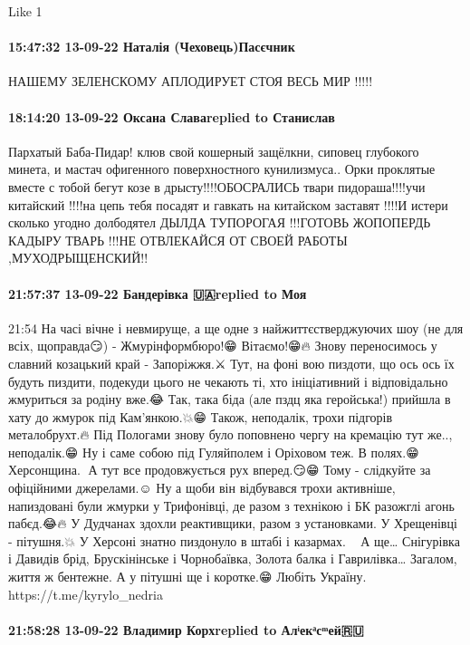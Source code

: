     Like 1

\paragraph{15:47:32 13-09-22 Наталія (Чеховець)Пасєчник}
НАШЕМУ ЗЕЛЕНСКОМУ АПЛОДИРУЕТ СТОЯ ВЕСЬ МИР !!!!!


\paragraph{18:14:20 13-09-22 Оксана Славаreplied to Станислав}

Пархатый Баба-Пидар! клюв свой кошерный защёлкни, сиповец глубокого минета, и
мастач офигенного поверхностного кунилизмуса.. Орки проклятые вместе с тобой
бегут козе в дрысту!!!!ОБОСРАЛИСЬ твари пидораша!!!!учи китайский !!!!на цепь
тебя посадят и гавкать на китайском заставят !!!!И истери сколько угодно
долбодятел ДЫЛДА ТУПОРОГАЯ !!!ГОТОВЬ ЖОПОПЕРДЬ КАДЫРУ ТВАРЬ !!!НЕ ОТВЛЕКАЙСЯ ОТ
СВОЕЙ РАБОТЫ ,МУХОДРЫЩЕНСКИЙ!!

\paragraph{21:57:37 13-09-22 Бандерівка 🇺🇦replied to Моя}
21:54
На часі вічне і невмируще, а ще одне з найжиттєстверджуючих шоу (не для всіх, щоправда😏) - Жмурінформбюро!😁 Вітаємо!😁🔥
Знову переносимось у славний козацький край - Запоріжжя.⚔️ Тут, на фоні вою пиздоти, що ось ось їх будуть пиздити, подекуди цього не чекають ті, хто ініціативний і відповідально жмуриться за родіну вже.😂 Так, така біда (але пздц яка геройська!) прийшла в хату до жмурок під Кам’янкою.💥😁 Також, неподалік, трохи підгорів металобрухт.🔥 Під Пологами знову було поповнено чергу на кремацію тут же.., неподалік.😁 Ну і саме собою під Гуляйполем і Оріховом теж. В полях.😁🤷🏻
Херсонщина.🍉 А тут все продовжується рух вперед.😏😁 Тому - слідкуйте за офіційними джерелами.☺️ Ну а щоби він відбувався трохи активніше, напиздовані були жмурки у Трифонівці, де разом з технікою і БК разожглі агонь пабєд.😂🔥 У Дудчанах здохли реактивщики, разом з установками. У Хрещенівці - пітушня.💥 У Херсоні знатно пиздонуло в штабі і казармах.🤷🏻💥 А ще… Снігурівка і Давидів брід, Брускінінське і Чорнобаївка, Золота балка і Гаврилівка…
Загалом, життя ж бентежне. А у пітушні ще і коротке.😁
Любіть Україну.💙💛
https://t.me/kyrylo_nedria

\paragraph{21:58:28 13-09-22 Владимир Корхreplied to Алͥекͣсͫей🇷🇺}

